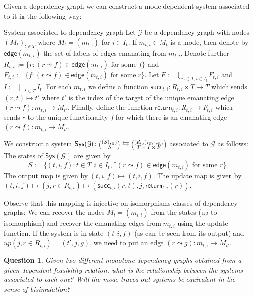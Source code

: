 \documentclass[12pt, a4paper]{article}
\theoremstyle{definition}
\theoremstyle{plain}
\theoremstyle{plain}
\theoremstyle{plain}
\theoremstyle{plain}
\newtheorem{question}[counter]{Question}
\theoremstyle{plain}
\theoremstyle{remark}
\theoremstyle{remark}
\newcommand{\mc}[1]{\mathcal{#1}}
\newcommand{\lens}[2]{\scaleobj{0.6}{\begin{pmatrix} \scaleobj{1.3}{{#1}} \\ \scaleobj{1.3}{{#2}} \end{pmatrix}}}
\begin{document}
Given a dependency graph we can construct a mode-dependent system associated to it in the following way:
\begin{tcdefinition}{System associated to dependency graph}{}
	Let $\mc{G}$ be a dependency graph with nodes $(M_t)_{t \in T}$ where $M_t  = (m_{t,i})$ for $i \in I_t$. If $m_{t,i} \in M_t$ is a mode, then denote by $\mathsf{edge}(m_{t,i})$ the set of labels of edges emanating from $m_{t,i}$. Denote further $R_{t,i} := \{ r : (r \leadsto f) \in \mathsf{edge}(m_{t,i}) \text{ for some } f\}$ and $F_{t,i} := \{ f : (r \leadsto f) \in \mathsf{edge}(m_{t,i}) \text{ for some } r\}$. Let $F := \bigcup_{t \in T, i \in I_t} F_{t,i}$ and $I := \bigsqcup_{t \in T} I_t$. For each $m_{t,i}$ we define a function $\mathsf{succ}_{t,i} \colon R_{t,i} \times T \rightarrow T$ which sends $(r,t) \mapsto t'$ where $t'$ is the index of the target of the unique emanating edge $(r \leadsto f) \colon m_{t,i} \rightarrow M_{t'}$. Finally, define the function $\mathsf{return}_{t,i} \colon R_{t,i} \rightarrow F_{t,i}$ which sends $r$ to the unique functionality $f$ for which there is an emanating edge $(r \leadsto f) \colon m_{t,i} \rightarrow M_{t'}$.
	
	We construct a system $\mathsf{Sys}(\mc{G}) \colon \lens{(S)_{s \in S}}{S} \leftrightarrows \lens{(R_{t,i})_{t \in T, i \in I_t}}{T \times I \times F}$ associated to $\mc{G}$ as follows:
	The states of $\mathsf{Sys}(\mc{G})$ are given by 
	$$S := \{ (t,i,f) : t \in T, i \in I_t, \exists (r \leadsto f) \in \mathsf{edge}(m_{t,i}) \text{ for some } r \}$$
	The output map is given by $(t,i,f) \mapsto (t,i,f)$.
	The update map is given by $ (t,i,f) \mapsto (j,r \in R_{t,i}) \mapsto (\mathsf{succ}_{t,i}(r,t),j, \mathsf{return}_{t,i}(r))$.

	Observe that this mapping is injective on isomorphisms classes of dependency graphs: We can recover the nodes $M_t = (m_{t,i})$ from the states (up to isomorphism) and recover the emanating edges from $m_{t,i}$ using the update function. If the system is in state $(t,i,f)$ (as can be seen from its output) and $up(j,r \in R_{t,i}) = (t', j, g)$, we need to put an edge $(r \leadsto g) \colon m_{t,i} \rightarrow M_{t'}$.
\end{tcdefinition}

\begin{question}
	Given two different monotone dependency graphs obtained from a given dependent feasibility relation, what is the relationship between the systems associated to each one? Will the mode-traced out systems be equivalent in the sense of bisimulation?
\end{question}
\end{document}
